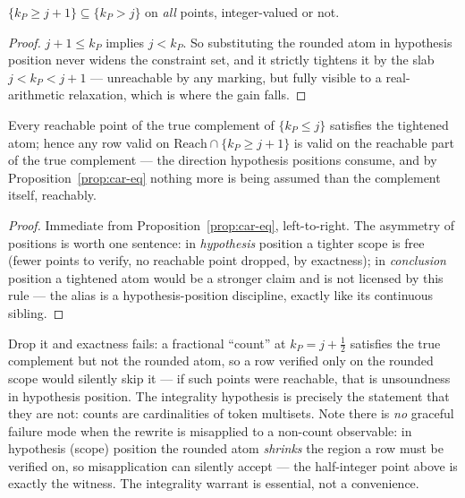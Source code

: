 \begin{bprop}\label{prop:car-tight}
$\{k_P \geq j + 1\} \subseteq \{k_P > j\}$ on \emph{all} points,
integer-valued or not.
\end{bprop}
\begin{proof}
$j + 1 \leq k_P$ implies $j < k_P$. So substituting the rounded atom in
hypothesis position never widens the constraint set, and it strictly
tightens it by the slab $j < k_P < j + 1$ --- unreachable by any
marking, but fully visible to a real-arithmetic relaxation, which is
where the gain falls.
\end{proof}

\begin{bprop}\label{prop:car-sound}
Every reachable point of the true complement of $\{k_P \leq j\}$
satisfies the tightened atom; hence any row valid on
$\mathrm{Reach} \cap \{k_P \geq j + 1\}$ is valid on the reachable part
of the true complement --- the direction hypothesis positions consume,
and by Proposition~\ref{prop:car-eq} nothing more is being assumed than
the complement itself, reachably.
\end{bprop}
\begin{proof}
Immediate from Proposition~\ref{prop:car-eq}, left-to-right. The
asymmetry of positions is worth one sentence: in \emph{hypothesis}
position a tighter scope is free (fewer points to verify, no reachable
point dropped, by exactness); in \emph{conclusion} position a tightened
atom would be a stronger claim and is not licensed by this rule ---
the alias is a hypothesis-position discipline, exactly like its
continuous sibling.
\end{proof}

\begin{bremark}\label{rem:car-int}
Drop it and exactness fails: a fractional ``count'' at
$k_P = j + \tfrac12$ satisfies the true complement but not the rounded
atom, so a row verified only on the rounded scope would silently skip
it --- if such points were reachable, that is unsoundness in hypothesis
position. The integrality hypothesis is precisely the statement that
they are not: counts are cardinalities of token multisets. Note there is \emph{no} graceful failure mode when the rewrite is
misapplied to a non-count observable: in hypothesis (scope) position
the rounded atom \emph{shrinks} the region a row must be verified on,
so misapplication can silently accept --- the half-integer point above
is exactly the witness. The integrality warrant is essential, not a
convenience.
\end{bremark}

